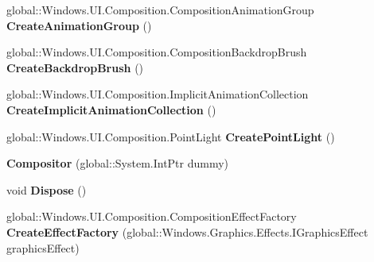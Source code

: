\begin{DoxyCompactItemize}
\item 
\mbox{\label{class_windows_1_1_u_i_1_1_composition_1_1_compositor_a80a2b13bdd26b7fead234728f4e048a4}} 
global\+::\+Windows.\+U\+I.\+Composition.\+Composition\+Animation\+Group {\bfseries Create\+Animation\+Group} ()
\item 
\mbox{\label{class_windows_1_1_u_i_1_1_composition_1_1_compositor_a718536eab5dc7541088008ef9798ad19}} 
global\+::\+Windows.\+U\+I.\+Composition.\+Composition\+Backdrop\+Brush {\bfseries Create\+Backdrop\+Brush} ()
\item 
\mbox{\label{class_windows_1_1_u_i_1_1_composition_1_1_compositor_a24135a36c54df364a599ced5e16e5440}} 
global\+::\+Windows.\+U\+I.\+Composition.\+Implicit\+Animation\+Collection {\bfseries Create\+Implicit\+Animation\+Collection} ()
\item 
\mbox{\label{class_windows_1_1_u_i_1_1_composition_1_1_compositor_abbf5f6803a17b21b39e1cf6a0b23fc6e}} 
global\+::\+Windows.\+U\+I.\+Composition.\+Point\+Light {\bfseries Create\+Point\+Light} ()
\item 
\mbox{\label{class_windows_1_1_u_i_1_1_composition_1_1_compositor_ae8673b74eda4f57113626510ac491007}} 
{\bfseries Compositor} (global\+::\+System.\+Int\+Ptr dummy)
\item 
\mbox{\label{class_windows_1_1_u_i_1_1_composition_1_1_compositor_ac90a7018efb0edbc42378c43cb94e3fa}} 
void {\bfseries Dispose} ()
\item 
\mbox{\label{class_windows_1_1_u_i_1_1_composition_1_1_compositor_a0f263c7b996908ce12d789c3d640ee71}} 
global\+::\+Windows.\+U\+I.\+Composition.\+Composition\+Effect\+Factory {\bfseries Create\+Effect\+Factory} (global\+::\+Windows.\+Graphics.\+Effects.\+I\+Graphics\+Effect graphics\+Effect)
\item 
\mbox{\label{class_windows_1_1_u_i_1_1_composition_1_1_compositor_ac3bb6a6e92997bf4740fbf43e243ea7a}} 

\end{DoxyCompactItemize}
